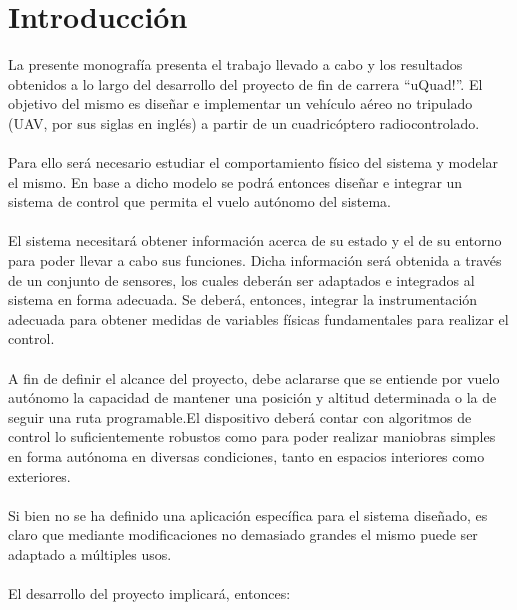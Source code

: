 \documentclass[main]{subfiles}
\begin{document}
\chapter*{Introducci\'on}

La presente monograf\'ia presenta el trabajo llevado a cabo y los resultados obtenidos a lo largo del desarrollo del  proyecto de fin de carrera ``uQuad!''. El objetivo del mismo es dise\~nar e implementar un veh\'iculo a\'ereo no tripulado (UAV, por sus siglas en ingl\'es) a partir de un cuadric\'optero radiocontrolado.\\
\\
Para ello ser\'a necesario estudiar el comportamiento f\'isico del sistema y modelar el mismo. En base a dicho modelo se podr\'a entonces dise\~nar e integrar un sistema de control que permita el vuelo aut\'onomo del sistema.\\
\\
El sistema necesitar\'a obtener informaci\'on acerca de su estado y el de su entorno para poder llevar a cabo sus funciones. Dicha informaci\'on ser\'a obtenida a trav\'es de un conjunto de sensores, los cuales deber\'an ser adaptados e integrados al sistema en forma adecuada. Se deber\'a, entonces, integrar la instrumentaci\'on adecuada para obtener medidas de variables f\'isicas fundamentales para realizar el control.\\
\\
A fin de definir el alcance del proyecto, debe aclararse que se entiende por vuelo aut\'onomo la capacidad de mantener una posici\'on y altitud determinada o la de seguir una ruta programable.El dispositivo deber\'a contar con algoritmos de control lo suficientemente robustos como para poder realizar maniobras simples en forma aut\'onoma en diversas condiciones, tanto en espacios interiores como exteriores.\\
\\
Si bien no se ha definido una aplicaci\'on espec\'ifica para el sistema dise\~nado, es claro que mediante modificaciones no demasiado grandes el mismo puede ser adaptado a m\'ultiples usos.\\
\\
El desarrollo del proyecto implicar\'a, entonces:
\end{document}
